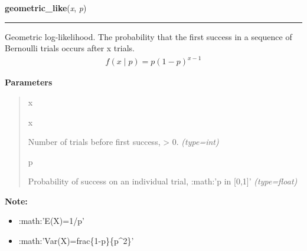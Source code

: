     \begin{boxedminipage}{\textwidth}

    \raggedright \textbf{geometric\_like}(\textit{x}, \textit{p})

    \vspace{-1.5ex}

    \rule{\textwidth}{0.5\fboxrule}

Geometric log-likelihood. The probability that the first success in a
sequence of Bernoulli trials occurs after x trials.
\begin{equation*}\begin{split}f(x \mid p) = p(1-p)^{x-1}\end{split}\end{equation*}    \vspace{1ex}

      \textbf{Parameters}
      \begin{quote}
        \begin{Ventry}{x}

          \item[x]


Number of trials before first success, {\textgreater} 0.
            \textit{(type=int)}

          \item[p]


Probability of success on an individual trial, :math:'p in {[}0,1{]}'
            \textit{(type=float)}

        \end{Ventry}

      \end{quote}

    \vspace{1ex}

\textbf{Note:} \begin{itemize}
\item {} 
:math:'E(X)=1/p'

\item {} 
:math:'Var(X)=frac{\{}1-p{\}}{\{}p{\textasciicircum}2{\}}'

\end{itemize}


    \end{boxedminipage}

    \label{pymc:distributions:rhalf_normal}

    \vspace{0.5ex}

